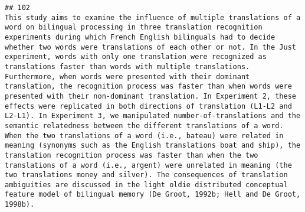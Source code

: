 \documentclass[
  english,
  man]{apa6}
\begin{document}
\begin{verbatim}
## 102                                                                                                                                                                                                                                                                                                                                                                                                                                                                                                                                                                                                                                                                                                                                                                                                                                                                                                                                                                                                                                                                                                                                                                                                                                                                                                                                            This study aims to examine the influence of multiple translations of a word on bilingual processing in three translation recognition experiments during which French English bilinguals had to decide whether two words were translations of each other or not. In the Just experiment, words with only one translation were recognized as translations faster than words with multiple translations. Furthermore, when words were presented with their dominant translation, the recognition process was faster than when words were presented with their non-dominant translation. In Experiment 2, these effects were replicated in both directions of translation (L1-L2 and L2-L1). In Experiment 3, we manipulated number-of-translations and the semantic relatedness between the different translations of a word. When the two translations of a word (i.e., bateau) were related in meaning (synonyms such as the English translations boat and ship), the translation recognition process was faster than when the two translations of a word (i.e., argent) were unrelated in meaning (the two translations money and silver). The consequences of translation ambiguities are discussed in the light oldie distributed conceptual feature model of bilingual memory (De Groot, 1992b; Hell and De Groot, 1998b).

\end{verbatim}
\end{document}
